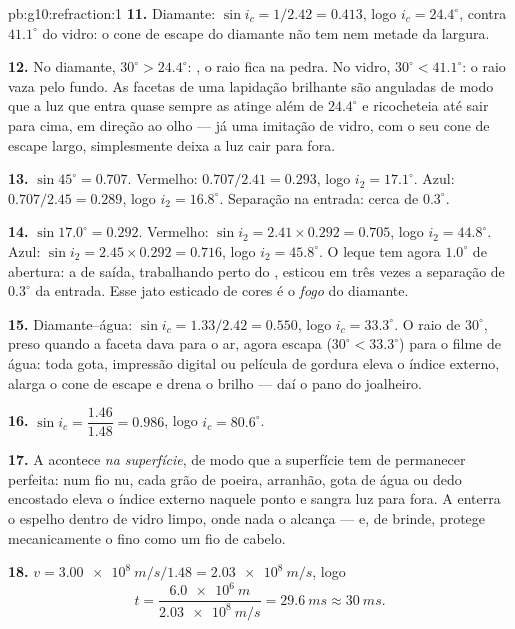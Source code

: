 \begin{solution}{pb:g10:refraction:1}
\textbf{11.} Diamante: $\sin i_c = 1/2.42 = 0.413$, logo
$i_c = 24.4^\circ$, contra $41.1^\circ$ do vidro: o cone de escape do
diamante não tem nem metade da largura.

\textbf{12.} No diamante, $30^\circ > 24.4^\circ$: , o raio
fica na pedra. No vidro, $30^\circ < 41.1^\circ$: o raio vaza pelo fundo.
As facetas de uma lapidação brilhante são anguladas de modo que a luz que
entra quase sempre as atinge além de $24.4^\circ$ e ricocheteia até sair
para cima, em direção ao olho --- já uma imitação de vidro, com o seu
cone de escape largo, simplesmente deixa a luz cair para fora.

\textbf{13.} $\sin 45^\circ = 0.707$. Vermelho: $0.707/2.41 = 0.293$,
logo $i_2 = 17.1^\circ$. Azul: $0.707/2.45 = 0.289$, logo
$i_2 = 16.8^\circ$. Separação na entrada: cerca de $0.3^\circ$.

\textbf{14.} $\sin 17.0^\circ = 0.292$. Vermelho: $\sin i_2 = 2.41 \times
0.292 = 0.705$, logo $i_2 = 44.8^\circ$. Azul: $\sin i_2 = 2.45 \times
0.292 = 0.716$, logo $i_2 = 45.8^\circ$. O leque tem agora $1.0^\circ$ de
abertura: a  de saída, trabalhando perto do ,
esticou em três vezes a separação de $0.3^\circ$ da entrada. Esse jato
esticado de cores é o \emph{fogo} do diamante.

\textbf{15.} Diamante--água: $\sin i_c = 1.33/2.42 = 0.550$, logo
$i_c = 33.3^\circ$. O raio de $30^\circ$, preso quando a faceta dava para
o ar, agora escapa ($30^\circ < 33.3^\circ$) para o filme de água: toda
gota, impressão digital ou película de gordura eleva o índice externo,
alarga o cone de escape e drena o brilho --- daí o pano do joalheiro.

\textbf{16.} $\sin i_c = \dfrac{1.46}{1.48} = 0.986$, logo
$i_c = 80.6^\circ$.

\textbf{17.} A  acontece \emph{na superfície}, de modo que
a superfície tem de permanecer perfeita: num fio nu, cada grão de poeira,
arranhão, gota de água ou dedo encostado eleva o índice externo naquele
ponto e sangra luz para fora. A  enterra o espelho dentro de vidro
limpo, onde nada o alcança --- e, de brinde, protege mecanicamente o
 fino como um fio de cabelo.

\textbf{18.} $v = \qty{3.00e8}{m/s}/1.48 = \qty{2.03e8}{m/s}$, logo
\[
t = \frac{\qty{6.0e6}{m}}{\qty{2.03e8}{m/s}} = \qty{29.6}{ms} \approx
\qty{30}{ms}.
\]


\end{solution}
